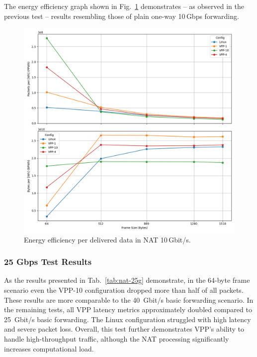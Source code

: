 The energy efficiency graph shown in Fig.~\ref{fig:nat-10g} demonstrates -- as observed in the previous test -- results resembling those of plain one-way 10\,Gbps forwarding.

\begin{figure}[!htbp]
    \centering
    \includegraphics[width=\linewidth]{images/consumption-nat-10g.png}
    \caption{Energy efficiency per delivered data in NAT 10\,Gbit/s.}
    \label{fig:nat-10g}
\end{figure}

\subsubsection{25 Gbps Test Results}

As the results presented in Tab.~\ref{tab:nat-25g} demonstrate, in the 64-byte frame scenario even the VPP-10 configuration dropped more than half of all packets. 
These results are more comparable to the 40~Gbit/s basic forwarding scenario.
In the remaining tests, all VPP latency metrics approximately doubled compared to 25~Gbit/s basic forwarding. The Linux configuration struggled with high latency and severe packet loss.
Overall, this test further demonstrates VPP's ability to handle high-throughput traffic, although the NAT processing significantly increases computational load.

